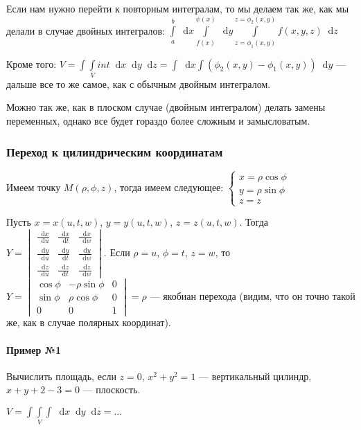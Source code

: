 \documentclass{article}
\newcommand*\diff{\mathop{}\!\mathrm{d}}
\begin{document}
Если нам нужно перейти к повторным интегралам, то мы делаем так же, как мы делали в случае двойных интегралов: $\int\limits_{a}^{b} \diff x \int\limits_{f(x)}^{\psi(x)} \diff y \int\limits_{z=\phi_1(x, y)}^{z=\phi_2(x,y)} f(x, y, z) \diff z$

Кроме того: $V = \int\int\limits_{V}int \diff x \diff y \diff z = \int \diff x \int (\phi_2(x, y) - \phi_1(x, y)) \diff y$ — дальше все то же самое, как с обычным двойным интегралом.

Можно так же, как в плоском случае (двойным интегралом) делать замены переменных, однако все будет гораздо более сложным и замысловатым.

\subsubsection{Переход к цилиндрическим координатам}

Имеем точку $M(\rho, \phi, z)$, тогда имеем следующее:
$\begin{cases}
    x = \rho \cos \phi \\
    y = \rho \sin \phi \\
    z = z
\end{cases}$

Пусть $x = x(u, t, w)$, $y = y(u, t, w)$, $z = z(u, t, w)$. Тогда $Y = \begin{vmatrix}
    \frac{\diff x}{\diff u} & \frac{\diff x}{\diff t} & \frac{\diff x}{\diff w} \\
    \frac{\diff y}{\diff u} & \frac{\diff y}{\diff t} & \frac{\diff y}{\diff w} \\
    \frac{\diff z}{\diff u} & \frac{\diff z}{\diff t} & \frac{\diff z}{\diff w}
\end{vmatrix}$. Если $\rho = u$, $\phi = t$, $z = w$, то $Y = \begin{vmatrix}
    \cos \phi & -\rho \sin \phi & 0 \\
    \sin \phi & \rho \cos \phi & 0 \\
    0 & 0 & 1
\end{vmatrix} = \rho$ — якобиан перехода (видим, что он точно такой же, как в случае полярных координат).

\paragraph{Пример №1} Вычислить площадь, если $z = 0$, $x^2+y^2=1$ — вертикальный цилиндр, $x+y+2-3=0$ — плоскость.

$V = \int\int\limits_{V}\int \diff x \diff y \diff z = \dots$ 
\end{document}
